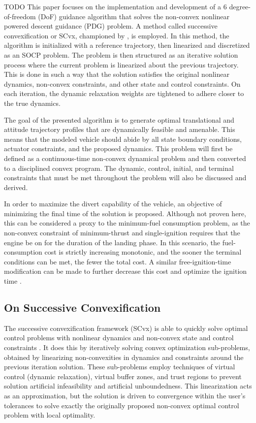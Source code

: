 \documentclass[conf]{new-aiaa}
\begin{document}
TODO
This paper focuses on the implementation and development of a 6 degree-of-freedom (DoF) guidance algorithm that solves the non-convex nonlinear powered descent guidance (PDG) problem. A method called successive convexification or SCvx, championed by \cite{mao2016successive}, is employed. In this method, the algorithm is initialized with a reference trajectory, then linearized and discretized as an SOCP problem. The problem is then structured as an iterative solution process where the current problem is linearized about the previous trajectory. This is done in such a way that the solution satisfies the original nonlinear dynamics, non-convex constraints, and other state and control constraints. On each iteration, the dynamic relaxation weights are tightened to adhere closer to the true dynamics.


The goal of the presented algorithm is to generate optimal translational and attitude trajectory profiles that are dynamically feasible and amenable. This means that the modeled vehicle should abide by all state boundary conditions, actuator constraints, and the proposed dynamics. This problem will first be defined as a continuous-time non-convex dynamical problem and then converted to a disciplined convex program. The dynamic, control, initial, and terminal constraints that must be met throughout the problem will also be discussed and derived.

In order to maximize the divert capability of the vehicle, an objective of minimizing the final time of the solution is proposed. Although not proven here, this can be considered a proxy to the minimum-fuel consumption problem, as the non-convex constraint of minimum-thrust and single-ignition requires that the engine be on for the duration of the landing phase. In this scenario, the fuel-consumption cost is strictly increasing monotonic, and the sooner the terminal conditions can be met, the fewer the total cost. A similar free-ignition-time modification can be made to further decrease this cost and  optimize the ignition time \cite{szmuk2019successive}. 


\subsection{On Successive Convexification}
The successive convexification framework (SCvx) is able to quickly solve optimal control problems with nonlinear dynamics and non-convex state and control constraints \cite{szmuk2018successive}. It does this by iteratively solving convex optimization sub-problems, obtained by linearizing non-convexities in dynamics and constraints around the previous iteration solution. These sub-problems employ techniques of virtual control (dynamic relaxation), virtual buffer zones, and trust regions to prevent solution artificial infeasibility and artificial unboundedness. This linearization acts as an approximation, but the solution is driven to convergence within the user's tolerances to solve exactly the originally proposed non-convex optimal control problem with local optimality.
\end{document}

